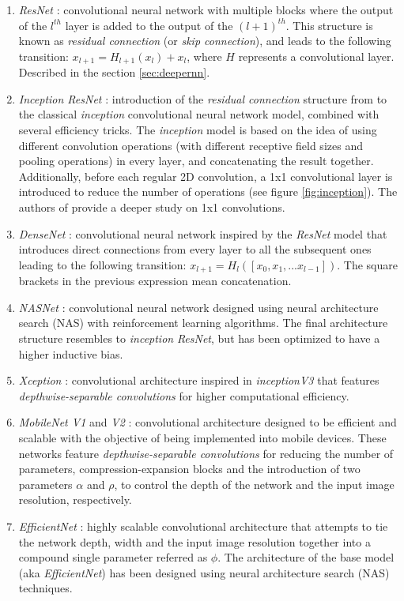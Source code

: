  \begin{enumerate}
	 \item \textit{ResNet} \autocite{kaiming2016}: convolutional neural network with multiple blocks where the output of the $l^{th}$ layer is added to the output of the $(l+1)^{th}$. This structure is known as \textit{residual connection} (or \textit{skip connection}), and leads to the following transition: $x_{l+1} = H_{l+1}(x_{l}) + x_l$, where $H$ represents a convolutional layer. Described in the section \ref{sec:deepernn}.
		\item \textit{Inception ResNet} \autocite{szegedy2017}: introduction of the \textit{residual connection} structure from \autocite{kaiming2016} to the classical \textit{inception} convolutional neural network model, combined with several efficiency tricks. The \textit{inception} model is based on the idea of using different convolution operations (with different receptive field sizes and pooling operations) in every layer, and concatenating the result together. Additionally, before each regular 2D convolution, a 1x1 convolutional layer is introduced to reduce the number of operations (see figure \ref{fig:inception}). The authors of \autocite{lin2014} provide a deeper study on 1x1 convolutions.
	 \item \textit{DenseNet} \autocite{huang2017}: convolutional neural network inspired by the \textit{ResNet} model \autocite{kaiming2016} that introduces direct connections from every layer to all the subsequent ones leading to the following transition: $x_{l+1} = H_l([x_0, x_1, ... x_{l-1}])$. The square brackets in the previous expression mean concatenation.
	 \item \textit{NASNet} \autocite{pham2018}: convolutional neural network designed using neural architecture search (NAS) with reinforcement learning algorithms. The final architecture structure resembles to \textit{inception} \textit{ResNet}, but has been optimized to have a higher inductive bias.
	 \item \textit{Xception} \autocite{chollet2017}: convolutional architecture inspired in \textit{inceptionV3}  \autocite{szegedy2016} that features \textit{depthwise-separable convolutions} for higher computational efficiency.
	 \item \textit{MobileNet V1} and \textit{V2} \autocite{howard2017, sandler2018}: convolutional architecture designed to be efficient and scalable with the objective of being implemented into mobile devices. These networks feature \textit{depthwise-separable convolutions} for reducing the number of parameters, compression-expansion blocks and the introduction of two parameters $\alpha$ and $\rho$, to control the depth of the network and the input image resolution, respectively.
	 \item \textit{EfficientNet} \autocite{tan2019}: highly scalable convolutional architecture that attempts to tie the network depth, width and the input image resolution  together into a compound single parameter referred as $\phi$. The architecture of the base model (aka \textit{EfficientNet}) has been designed using neural architecture search (NAS) techniques.
 \end{enumerate}
 

